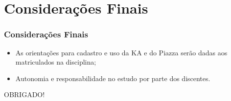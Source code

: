 \section{Considerações Finais}


\begin{frame}
	\frametitle{Considerações Finais}
	
	\begin{itemize}
		\item As orientações para cadastro e uso da KA e do Piazza serão dadas aos matriculados na disciplina; \pause
		\item Autonomia e responsabilidade no estudo por parte dos discentes. \pause
	\end{itemize}
	
	\vspace{1.8cm}

	\begin{center}
		\begin{large}
			OBRIGADO!
		\end{large}
	\end{center}

\end{frame}

